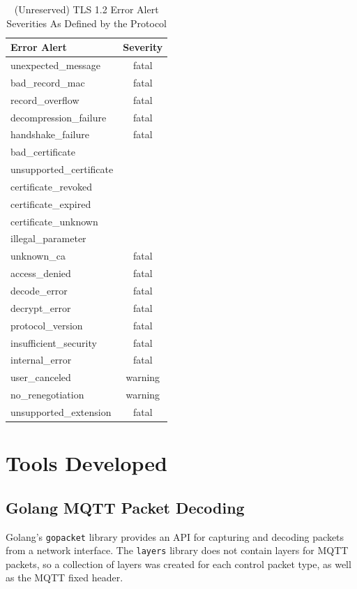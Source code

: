 \documentclass[12pt]{article}
\begin{document}
\begin{table}[!hbt]
\centering
\caption{(Unreserved) TLS 1.2 Error Alert Severities As Defined by the Protocol\label{table:error-severity}}
\begin{tabular}{|lc|} 
\hline
Error Alert              & Severity  \\ 
\hline
unexpected\_message      & fatal     \\
bad\_record\_mac         & fatal     \\
record\_overflow         & fatal     \\
decompression\_failure   & fatal     \\
handshake\_failure       & fatal     \\
bad\_certificate         &           \\
unsupported\_certificate &           \\
certificate\_revoked     &           \\
certificate\_expired     &           \\
certificate\_unknown     &           \\
illegal\_parameter       &           \\
unknown\_ca              & fatal     \\
access\_denied           & fatal     \\
decode\_error            & fatal     \\
decrypt\_error           & fatal     \\
protocol\_version        & fatal     \\
insufficient\_security   & fatal     \\
internal\_error          & fatal     \\
user\_canceled           & warning   \\
no\_renegotiation        & warning   \\
unsupported\_extension   & fatal    \\
\hline
\end{tabular}
\end{table}

\section{Tools Developed}
\subsection{Golang MQTT Packet Decoding}
Golang's \texttt{gopacket} library provides an API for capturing and decoding packets from a network interface. The \texttt{layers} library does not contain layers for MQTT packets, so a collection of layers was created for each control packet type, as well as the MQTT fixed header. 
\end{document}
